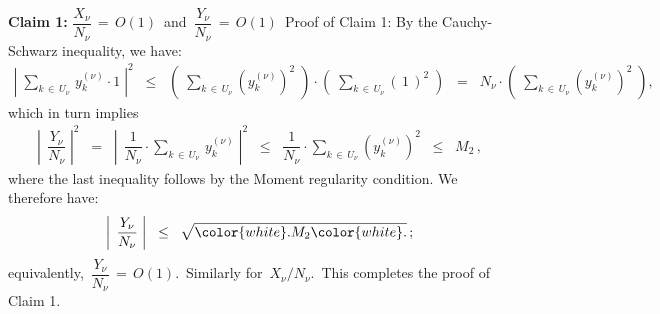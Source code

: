 \begin{enumerate}
    \vskip 0.3cm
    \noindent
    \textbf{Claim 1:}\quad
    $\dfrac{X_{\nu}}{N_{\nu}} \,=\, O(1)$\;\,
    and
    \;\,$\dfrac{Y_{\nu}}{N_{\nu}} \,=\, O(1)$\,
    \vskip 0.1cm
    \noindent
    Proof of Claim 1:\;\;
    By the Cauchy-Schwarz inequality, we have:
    \begin{eqnarray*}
    \left\vert\;
        \underset{k\,\in\,U_{\nu}}{\sum}\,
        y^{(\nu)}_{k} \cdot 1
        \;\right\vert^{2}
    \;\; \leq \;\;
        \left(\;
            \underset{k\,\in\,U_{\nu}}{\sum}
            (y^{(\nu)}_{k})^{2}
            \;\right)
        \cdot
        \left(\;
            \underset{k\,\in\,U_{\nu}}{\sum}
            (\,1\,)^{2}
            \;\right)
    \;\; = \;\;
        N_{\nu}
        \cdot
        \left(\;
            \underset{k\,\in\,U_{\nu}}{\sum}
            (y^{(\nu)}_{k})^{2}
            \;\right),
    \end{eqnarray*}
    which in turn implies
    \begin{eqnarray*}
    \left\vert\;\,
        \dfrac{Y_{\nu}}{N_{\nu}}
        \;\right\vert^{2}
    \;\; = \;\;
        \left\vert\;\,
            \dfrac{1}{N_{\nu}}
            \cdot
            \underset{k\,\in\,U_{\nu}}{\sum}\,
            y^{(\nu)}_{k}
            \;\right\vert^{2}
    \;\; \leq \;\;
        \dfrac{1}{N_{\nu}}
        \cdot
        \underset{k\,\in\,U_{\nu}}{\sum}
        (y^{(\nu)}_{k})^{2}
    \;\; \leq \;\;
        M_{2}\,,
    \end{eqnarray*}
    where the last inequality follows by the Moment regularity condition.
    We therefore have:
    \begin{eqnarray*}
    \left\vert\;\,
        \dfrac{Y_{\nu}}{N_{\nu}}
        \;\right\vert
    \;\; \leq \;\;
        \sqrt{{\color{white}.}M_{2}{\color{white}.}}\,;
    \end{eqnarray*}
    equivalently,
    \,$
    \dfrac{Y_{\nu}}{N_{\nu}} \,=\, O(1)
    $.\,
    Similarly for \,$X_{\nu} \slash N_{\nu}$.\,
    This completes the proof of Claim 1.


\end{enumerate}
